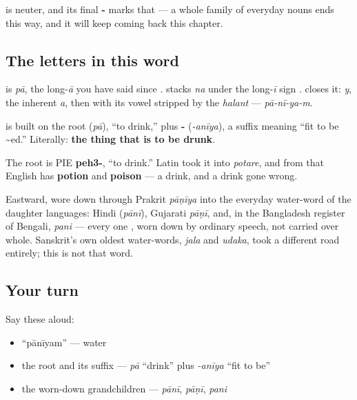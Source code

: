 \textbf{} is neuter, and its final \textbf{-} marks that — a whole family of everyday nouns ends this way, and it will keep coming back this chapter.

\subsection*{The letters in this word}
\textbf{} is \emph{pā}, the long-\emph{ā} you have said since \textbf{}. \textbf{} stacks \textbf{} \emph{na} under the long-\emph{ī} sign \textbf{}. \textbf{} closes it: \emph{y}, the inherent \emph{a}, then \textbf{} with its vowel stripped by the \emph{halant} — \emph{pā-nī-ya-m}.

\begin{cousinweb}
\textbf{} is built on the root \textbf{} (\emph{pā}), \textquotedblleft{}to drink,\textquotedblright{} plus \textbf{-} (\emph{-anīya}), a suffix meaning \textquotedblleft{}fit to be \textasciitilde{}ed.\textquotedblright{} Literally: \textbf{the thing that is to be drunk}.

The root is PIE \textbf{peh3-}, \textquotedblleft{}to drink.\textquotedblright{} Latin took it into \emph{potare}, and from that English has \textbf{potion} and \textbf{poison} — a drink, and a drink gone wrong.

Eastward, \textbf{} wore down through Prakrit \emph{pāṇīya} into the everyday water-word of the daughter languages: Hindi \textbf{} (\emph{pānī}), Gujarati \emph{pāṇī}, and, in the Bangladesh register of Bengali, \emph{pani} — every one \textbf{}, worn down by ordinary speech, not carried over whole. Sanskrit's own oldest water-words, \emph{jala} and \emph{udaka}, took a different road entirely; this is not that word.
\end{cousinweb}

\subsection*{Your turn}
Say these aloud:

\begin{itemize}
\raggedright
  \item \textquotedblleft{}pānīyam\textquotedblright{} — water
  \item the root and its suffix — \emph{pā} \textquotedblleft{}drink\textquotedblright{} plus \emph{-anīya} \textquotedblleft{}fit to be\textquotedblright{}
  \item the worn-down grandchildren — \emph{pānī}, \emph{pāṇī}, \emph{pani}
\end{itemize}


